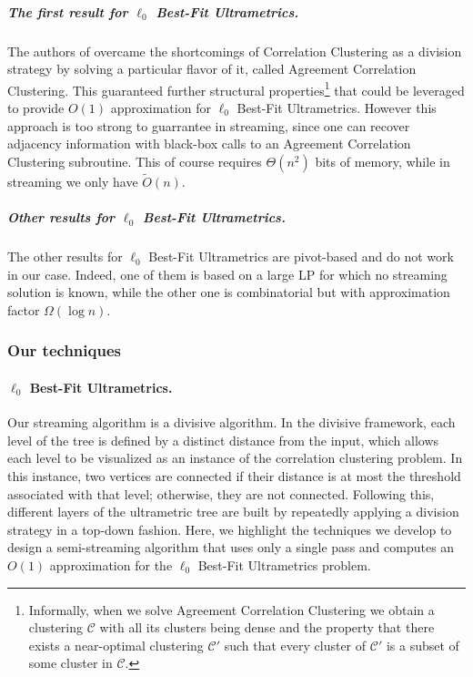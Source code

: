 \documentclass{article}
\begin{document}
\subparagraph{The first result for $\ell_0$ Best-Fit Ultrametrics.} The authors of \cite{cohen2022fitting} overcame the shortcomings of Correlation Clustering as a division strategy by solving a particular flavor of it, called Agreement Correlation Clustering. This guaranteed further structural properties\footnote{Informally, when we solve Agreement Correlation Clustering we obtain a clustering $\mathcal{C}$ with all its clusters being dense and the property that there exists a near-optimal clustering $\mathcal{C'}$ such that every cluster of $\mathcal{C'}$ is a subset of some cluster in $\mathcal{C}$.} that could be leveraged to provide $O(1)$ approximation for $\ell_0$ Best-Fit Ultrametrics. However this approach is too strong to guarrantee in streaming, since one can recover adjacency information with black-box calls to an Agreement Correlation Clustering subroutine. This of course requires $\Theta(n^2)$ bits of memory, while in streaming we only have $\widetilde{O}(n)$.

\subparagraph{Other results for $\ell_0$ Best-Fit Ultrametrics.} The other results for $\ell_0$ Best-Fit Ultrametrics are pivot-based and do not work in our case. Indeed, one of them \cite{CharikarG24} is based on a large LP for which no streaming solution is known, while the other one \cite{cohen2022fitting} is combinatorial but with approximation factor $\Omega(\log{n})$.


\subsubsection{Our techniques}\label{section:techniques}

\paragraph*{$\ell_0$ Best-Fit Ultrametrics.}
Our streaming algorithm is a divisive algorithm.
In the divisive framework, each level of the tree is defined by a distinct distance from the input, which allows each level to be visualized as an instance of the correlation clustering problem.
In this instance, two vertices are connected if their distance is at most the threshold associated with that level; otherwise, they are not connected.
Following this, different layers of the ultrametric tree are built by repeatedly applying a division strategy in a top-down fashion.
Here, we highlight the techniques we develop to design a semi-streaming algorithm that uses only a single pass and computes an $O(1)$ approximation for the $\ell_0$ Best-Fit Ultrametrics problem.
\end{document}
